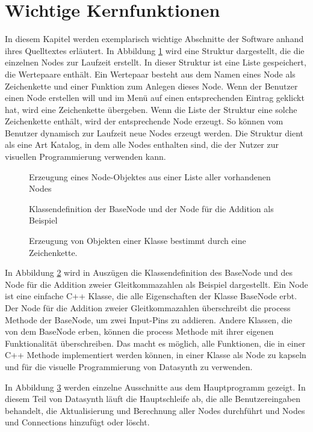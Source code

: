 \documentclass[a4paper, 
               12pt,
               DIV=calc,
               version=first,
               pdftex,
               headsepline,
               footsepline,
               bibliography=totocnumbered,
               listof=numbered]{scrreprt}
\begin{document}
\section{Wichtige Kernfunktionen}
\label{sec:Kernfunktionen}
In diesem Kapitel werden exemplarisch wichtige Abschnitte der Software anhand ihres Quelltextes
erläutert.
In Abbildung \ref{fig:factory} wird eine Struktur dargestellt, die die einzelnen
Nodes zur Laufzeit erstellt. In dieser Struktur ist eine Liste gespeichert, die Wertepaare
enthält. Ein Wertepaar besteht aus dem Namen eines Node als Zeichenkette und einer Funktion
zum Anlegen dieses Node.
Wenn der Benutzer einen Node erstellen will und im Menü auf einen entsprechenden Eintrag geklickt hat,
wird eine Zeichenkette übergeben. Wenn die Liste der Struktur eine solche Zeichenkette enthält, wird der
entsprechende Node erzeugt. So können vom Benutzer dynamisch zur Laufzeit
neue Nodes erzeugt werden. Die Struktur dient als eine Art Katalog, in dem alle
Nodes enthalten sind, die der Nutzer zur visuellen Programmierung verwenden kann.
\begin{figure}
\centering

\caption{Erzeugung eines Node-Objektes aus einer Liste aller vorhandenen Nodes}
\label{fig:factory}
\end{figure}
\begin{figure}
\centering

\caption{Klassendefinition der BaseNode und der Node für die Addition als Beispiel}
\label{fig:node}
\end{figure}
\begin{figure}
\centering

\caption{Erzeugung von Objekten einer Klasse bestimmt durch eine Zeichenkette.}
\label{fig:core}
\end{figure}
In Abbildung \ref{fig:node} wird in Auszügen die Klassendefinition des BaseNode und
des Node für die Addition zweier Gleitkommazahlen als Beispiel dargestellt.
Ein Node ist eine einfache C++ Klasse, die alle Eigenschaften der Klasse BaseNode erbt.
Der Node für die Addition zweier Gleitkommazahlen überschreibt die process Methode der BaseNode, um zwei
Input-Pins zu addieren. Andere Klassen, die von dem BaseNode erben, können die process
Methode mit ihrer eigenen Funktionalität überschreiben.
Das macht es möglich, alle Funktionen, die in einer C++ Methode implementiert werden können,
in einer Klasse als Node zu kapseln und für die visuelle Programmierung von Datasynth zu verwenden.

In Abbildung \ref{fig:core} werden einzelne Ausschnitte aus dem Hauptprogramm gezeigt.
In diesem Teil von Datasynth läuft die Hauptschleife ab, die alle Benutzereingaben behandelt,
die Aktualisierung und Berechnung aller Nodes durchführt und Nodes und Connections
hinzufügt oder löscht.
\end{document}
